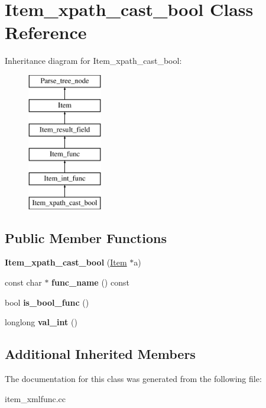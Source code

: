 \hypertarget{classItem__xpath__cast__bool}{}\section{Item\+\_\+xpath\+\_\+cast\+\_\+bool Class Reference}
\label{classItem__xpath__cast__bool}
Inheritance diagram for Item\+\_\+xpath\+\_\+cast\+\_\+bool\+:\begin{figure}[H]
\begin{center}
\leavevmode
\includegraphics[height=6.000000cm]{classItem__xpath__cast__bool}
\end{center}
\end{figure}
\subsection*{Public Member Functions}
\begin{DoxyCompactItemize}
\item 
\mbox{\label{classItem__xpath__cast__bool_afbef287f5da304c385da80daed5ffa8e}} 
{\bfseries Item\+\_\+xpath\+\_\+cast\+\_\+bool} (\mbox{\hyperlink{classItem}{Item}} $\ast$a)
\item 
\mbox{\label{classItem__xpath__cast__bool_a9568289f35c0d6630b832f1e067fe43c}} 
const char $\ast$ {\bfseries func\+\_\+name} () const
\item 
\mbox{\label{classItem__xpath__cast__bool_a22ade1ff55b0018e24342edef2c94817}} 
bool {\bfseries is\+\_\+bool\+\_\+func} ()
\item 
\mbox{\label{classItem__xpath__cast__bool_a37fad3e396ffac21071fa0d7ad2d88c0}} 
longlong {\bfseries val\+\_\+int} ()
\end{DoxyCompactItemize}
\subsection*{Additional Inherited Members}


The documentation for this class was generated from the following file\+:\begin{DoxyCompactItemize}
\item 
item\+\_\+xmlfunc.\+cc\end{DoxyCompactItemize}
